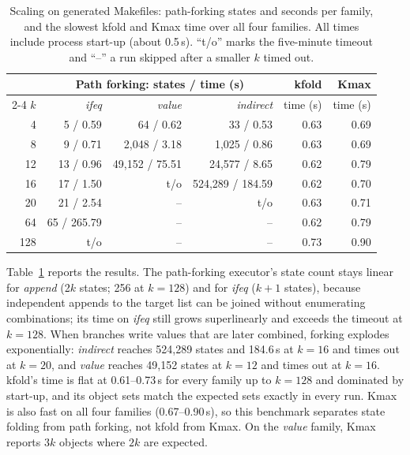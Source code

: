 \documentclass[acmsmall]{acmart}
\newcommand{\tool}{\textsf{kfold}\xspace}
\newcommand{\kmax}{\textsf{Kmax}\xspace}
\begin{document}
\begin{table}[t]
\centering\small
\caption{Scaling on generated Makefiles: path-forking states and seconds per family, and the slowest \tool and \kmax time over all four families.
All times include process start-up (about 0.5\,s).
``t/o'' marks the five-minute timeout and ``--'' a run skipped after a smaller $k$ timed out.}
\label{tab:scaling-bench}
\begin{tabular}{@{}rrrrrr@{}}
\toprule
& \multicolumn{3}{c}{Path forking: states / time (s)} & \tool & \kmax \\
\cmidrule(lr){2-4}
$k$ & \emph{ifeq} & \emph{value} & \emph{indirect} & time (s) & time (s) \\
\midrule
4 & 5 / 0.59 & 64 / 0.62 & 33 / 0.53 & 0.63 & 0.69 \\
8 & 9 / 0.71 & 2,048 / 3.18 & 1,025 / 0.86 & 0.63 & 0.69 \\
12 & 13 / 0.96 & 49,152 / 75.51 & 24,577 / 8.65 & 0.62 & 0.79 \\
16 & 17 / 1.50 & t/o & 524,289 / 184.59 & 0.62 & 0.70 \\
20 & 21 / 2.54 & -- & t/o & 0.63 & 0.71 \\
64 & 65 / 265.79 & -- & -- & 0.62 & 0.79 \\
128 & t/o & -- & -- & 0.73 & 0.90 \\
\bottomrule
\end{tabular}
\end{table}

Table~\ref{tab:scaling-bench} reports the results.
The path-forking executor's state count stays linear for \emph{append} (2$k$ states; 256 at $k=128$) and for \emph{ifeq} ($k+1$ states), because independent appends to the target list can be joined without enumerating combinations; its time on \emph{ifeq} still grows superlinearly and exceeds the timeout at $k=128$.
When branches write values that are later combined, forking explodes exponentially: \emph{indirect} reaches 524,289 states and 184.6\,s at $k=16$ and times out at $k=20$, and \emph{value} reaches 49,152 states at $k=12$ and times out at $k=16$.
\tool's time is flat at 0.61--0.73\,s for every family up to $k=128$ and dominated by start-up, and its object sets match the expected sets exactly in every run.
\kmax is also fast on all four families (0.67--0.90\,s), so this benchmark separates state folding from path forking, not \tool from \kmax.
On the \emph{value} family, \kmax reports $3k$ objects where $2k$ are expected.
\end{document}
